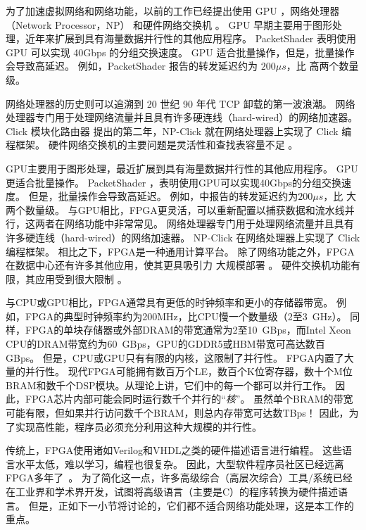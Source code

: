 为了加速虚拟网络和网络功能，以前的工作已经提出使用 GPU \cite {packetshader}，网络处理器（Network Processor，NP） \cite {cavium,netronome} 和硬件网络交换机 \cite {duet}。
GPU 早期主要用于图形处理，近年来扩展到具有海量数据并行性的其他应用程序。
PacketShader \cite {packetshader} 表明使用 GPU 可以实现 40Gbps 的分组交换速度。
GPU 适合批量操作，但是，批量操作会导致高延迟。
例如，PacketShader \cite {packetshader} 报告的转发延迟约为 $200 \mu{}s$，比 \name{} 高两个数量级。

网络处理器的历史则可以追溯到 20 世纪 90 年代 TCP 卸载的第一波浪潮。
网络处理器专门用于处理网络流量并且具有许多硬连线（hard-wired）的网络加速器。
Click 模块化路由器 \cite{kohler2000click} 提出的第二年，NP-Click \cite{shah2004np} 就在网络处理器上实现了 Click 编程框架。
硬件网络交换机的主要问题是灵活性和查找表容量不足 \cite {duet}。


GPU主要用于图形处理，最近扩展到具有海量数据并行性的其他应用程序。 GPU更适合批量操作。 PacketShader \cite {packetshader}，表明使用GPU可以实现40Gbps的分组交换速度。
但是，批量操作会导致高延迟。
例如，\cite {packetshader}中报告的转发延迟约为$200 \mu{}s$，比 \name{} 大两个数量级。
与GPU相比，FPGA更灵活，可以重新配置以捕获数据和流水线并行，这两者在网络功能中非常常见。
网络处理器专门用于处理网络流量并且具有许多硬连线（hard-wired）的网络加速器。
NP-Click \cite{shah2004np} 在网络处理器上实现了 Click 编程框架。
相比之下，FPGA是一种通用计算平台。
除了网络功能之外，FPGA在数据中心还有许多其他应用，使其更具吸引力
大规模部署 \cite {putnam2014reconfigurable}。
硬件交换机功能有限，其应用受到很大限制 \cite {duet}。

与CPU或GPU相比，FPGA通常具有更低的时钟频率和更小的存储器带宽。
例如，FPGA的典型时钟频率约为200MHz，比CPU慢一个数量级（2至3~GHz）。
同样，FPGA的单块存储器或外部DRAM的带宽通常为2至10~GBps，而Intel Xeon CPU的DRAM带宽约为60~GBps，GPU的GDDR5或HBM带宽可高达数百 GBps。
但是，CPU或GPU只有有限的内核，这限制了并行性。 FPGA内置了大量的并行性。
现代FPGA可能拥有数百万个LE，数百个K位寄存器，数十个M位BRAM和数千个DSP模块。从理论上讲，它们中的每一个都可以并行工作。
因此，FPGA芯片内部可能会同时运行数千个并行的``\textit {核}''。
虽然单个BRAM的带宽可能有限，但如果并行访问数千个BRAM，则总内存带宽可达数TBps！
因此，为了实现高性能，程序员必须充分利用这种大规模的并行性。

传统上，FPGA使用诸如Verilog和VHDL之类的硬件描述语言进行编程。
这些语言水平太低，难以学习，编程也很复杂。
因此，大型软件程序员社区已经远离FPGA多年了~\cite {bacon2013fpga}。
为了简化这一点，许多高级综合（高层次综合）工具/系统已经在工业界和学术界开发，试图将高级语言（主要是C）的程序转换为硬件描述语言。
但是，正如下一小节将讨论的，它们都不适合网络功能处理，这是本工作的重点。

